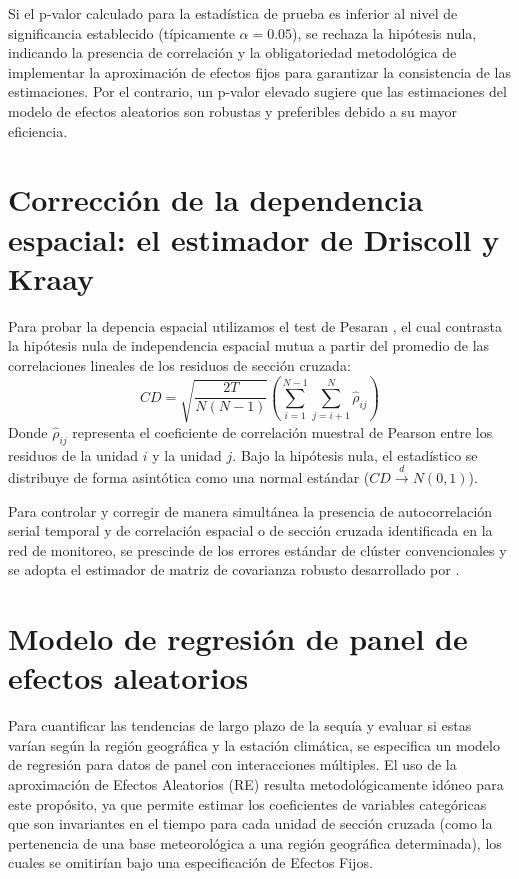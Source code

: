 Si el p-valor calculado para la estadística de prueba es inferior al nivel de significancia establecido (típicamente $\alpha = 0.05$), se rechaza la hipótesis nula, indicando la presencia de correlación y la obligatoriedad metodológica de implementar la aproximación de efectos fijos para garantizar la consistencia de las estimaciones. Por el contrario, un p-valor elevado sugiere que las estimaciones del modelo de efectos aleatorios son robustas y preferibles debido a su mayor eficiencia.

\section{Corrección de la dependencia espacial: el estimador de Driscoll y Kraay}

Para probar la depencia espacial utilizamos el test de Pesaran \cite{pesaran2004}, el cual contrasta la hipótesis nula de independencia espacial mutua a partir del promedio de las correlaciones lineales de los residuos de sección cruzada:
\begin{equation}
    CD = \sqrt{\frac{2T}{N(N-1)}} \left( \sum_{i=1}^{N-1} \sum_{j=i+1}^{N} \hat{\rho}_{ij} \right)
\end{equation}
Donde $\hat{\rho}_{ij}$ representa el coeficiente de correlación muestral de Pearson entre los residuos de la unidad $i$ y la unidad $j$. Bajo la hipótesis nula, el estadístico se distribuye de forma asintótica como una normal estándar ($CD \xrightarrow{d} N(0, 1)$).

Para controlar y corregir de manera simultánea la presencia de autocorrelación serial temporal y de correlación espacial o de sección cruzada identificada en la red de monitoreo, se prescinde de los errores estándar de clúster convencionales y se adopta el estimador de matriz de covarianza robusto desarrollado por .

\section{Modelo de regresión de panel de efectos aleatorios}

Para cuantificar las tendencias de largo plazo de la sequía y evaluar si estas varían según la región geográfica y la estación climática, se especifica un modelo de regresión para datos de panel con interacciones múltiples. El uso de la aproximación de Efectos Aleatorios (RE) resulta metodológicamente idóneo para este propósito, ya que permite estimar los coeficientes de variables categóricas que son invariantes en el tiempo para cada unidad de sección cruzada (como la pertenencia de una base meteorológica a una región geográfica determinada), los cuales se omitirían bajo una especificación de Efectos Fijos.

